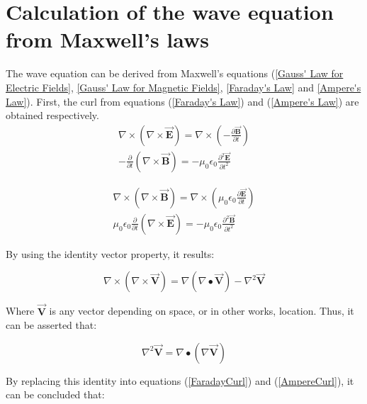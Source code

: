 \chapter{Calculation of the wave equation from Maxwell's laws}
\label{WaveEquation_MaxwellEquations}

The wave equation can be derived from Maxwell's equations (\ref{Gauss' Law for Electric Fields}, \ref{Gauss' Law for Magnetic Fields}, \ref{Faraday's Law} and \ref{Ampere's Law}). First, the curl from equations (\ref{Faraday's Law}) and (\ref{Ampere's Law}) are obtained respectively.
\begin{eqnarray}
    \nabla \times (\nabla \times \overrightarrow{\textbf{E}}) = \nabla \times \left( -\frac{\partial \overrightarrow{\textbf{B}}}{\partial t} \right) \nonumber\\
   -\frac{\partial}{\partial t}(\nabla \times \overrightarrow{\textbf{B}}) = -\mu_0 \epsilon_0 \frac{\partial^2 \overrightarrow{\textbf{E}}}{\partial t^2}
   \label{FaradayCurl}
\end{eqnarray}

\begin{eqnarray}
    \nabla \times (\nabla \times \overrightarrow{\textbf{B}}) = \nabla \times \left( \mu_0 \epsilon_0\frac{\partial \overrightarrow{\textbf{E}}}{\partial t} \right) \nonumber\\
    \mu_0 \epsilon_0 \frac{\partial}{\partial t}(\nabla \times \overrightarrow{\textbf{E}}) = -\mu_0 \epsilon_0 \frac{\partial^2 \overrightarrow{\textbf{B}}}{\partial t^2}
    \label{AmpereCurl}
\end{eqnarray}

By using the identity vector property, it results:

\begin{equation}
    \nabla \times (\nabla \times \overrightarrow{\textbf{V}}) = \nabla(\nabla \bullet \overrightarrow{\textbf{V}}) - \nabla^2 \overrightarrow{\textbf{V}}
\end{equation}

Where $\overrightarrow{\textbf{V}}$ is any vector depending on space, or in other works, location. Thus, it can be asserted that:

\begin{equation}
    \nabla^2 \overrightarrow{\textbf{V}} = \nabla \bullet (\nabla \overrightarrow{\textbf{V}})
\end{equation}

By replacing this identity into equations (\ref{FaradayCurl}) and (\ref{AmpereCurl}), it can be concluded that:

